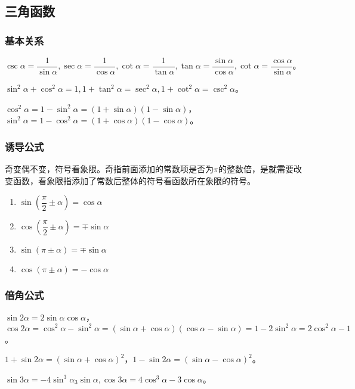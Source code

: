 \documentclass[UTF8, 12pt]{ctexart}
\begin{document}
        \subsection{三角函数}

        \subsubsection{基本关系}

        $\csc\alpha=\dfrac{1}{\sin\alpha},\sec\alpha=\dfrac{1}{\cos\alpha},\cot\alpha=\dfrac{1}{\tan\alpha},\tan\alpha=\dfrac{\sin\alpha}{\cos\alpha},\cot\alpha=\dfrac{\cos\alpha}{\sin\alpha}$。

        $\sin^2\alpha+\cos^2\alpha=1,1+\tan^2\alpha=\sec^2\alpha,1+\cot^2\alpha=\csc^2\alpha$。

        $\cos^2\alpha=1-\sin^2\alpha=(1+\sin\alpha)(1-\sin\alpha)$，$\sin^2\alpha=1-\cos^2\alpha=(1+\cos\alpha)(1-\cos\alpha)$。

        \subsubsection{诱导公式}

        奇变偶不变，符号看象限。奇指前面添加的常数项是否为$\pi$的整数倍，是就需要改变函数，看象限指添加了常数后整体的符号看函数所在象限的符号。

        \begin{enumerate}
            \item $\sin(\dfrac{\pi}{2}\pm\alpha)=\cos\alpha$
            \item $\cos(\dfrac{\pi}{2}\pm\alpha)=\mp\sin\alpha$
            \item $\sin(\pi\pm\alpha)=\mp\sin\alpha$
            \item $\cos(\pi\pm\alpha)=-\cos\alpha$
        \end{enumerate}

        \subsubsection{倍角公式}

        $\sin 2\alpha=2\sin\alpha\cos\alpha$，$\cos 2\alpha=\cos^2\alpha-\sin^2\alpha=(\sin\alpha+\cos\alpha)(\cos\alpha-\sin\alpha)=1-2\sin^2\alpha=2\cos^2\alpha-1$。

        $1+\sin2\alpha=(\sin\alpha+\cos\alpha)^2$，$1-\sin2\alpha=(\sin\alpha-\cos\alpha)^2$。

        $\sin 3\alpha=-4\sin^3\alpha_3\sin\alpha,\cos 3\alpha=4\cos^3\alpha-3\cos\alpha$。
\end{document}
